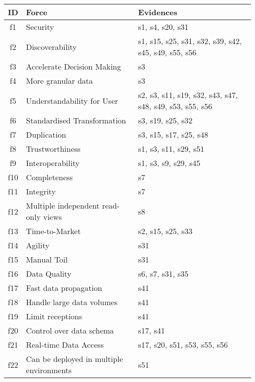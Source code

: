 \begin{tabular}{|c|p{}|p{}|}
\hline
{\bf ID} & {\bf Force} & {\bf Evidences}\\
\hline
f1 & Security & \cellcolor{emerald_shape_2} {s1, s4, s20, s31}\\
f2 & Discoverability & \cellcolor{emerald_shape_4} {s1, s15, s25, s31, s32, s39, s42, s45, s49, s55, s56}\\
f3 & Accelerate Decision Making & \cellcolor{emerald_shape_1} {s3}\\
f4 & More granular data & \cellcolor{emerald_shape_1} {s3}\\
f5 & Understandability for User & \cellcolor{emerald_shape_4} {s2, s3, s11, s19, s32, s43, s47, s48, s49, s53, s55, s56}\\
f6 & Standardised Transformation & \cellcolor{emerald_shape_2} {s3, s19, s25, s32}\\
f7 & Duplication & \cellcolor{emerald_shape_3} {s3, s15, s17, s25, s48}\\
f8 & Trustworthiness & \cellcolor{emerald_shape_3} {s1, s3, s11, s29, s51}\\
f9 & Interoperability & \cellcolor{emerald_shape_3} {s1, s3, s9, s29, s45}\\
f10 & Completeness & \cellcolor{emerald_shape_1} {s7}\\
f11 & Integrity & \cellcolor{emerald_shape_1} {s7}\\
f12 & Multiple independent read-only views & \cellcolor{emerald_shape_1} {s8}\\
f13 & Time-to-Market & \cellcolor{emerald_shape_2} {s2, s15, s25, s33}\\
f14 & Agility & \cellcolor{emerald_shape_1} {s31}\\
f15 & Manual Toil & \cellcolor{emerald_shape_1} {s31}\\
f16 & Data Quality & \cellcolor{emerald_shape_2} {s6, s7, s31, s35}\\
f17 & Fast data propagation & \cellcolor{emerald_shape_1} {s41}\\
f18 & Handle large data volumes & \cellcolor{emerald_shape_1} {s41}\\
f19 & Limit receptions & \cellcolor{emerald_shape_1} {s41}\\
f20 & Control over data schema & \cellcolor{emerald_shape_1} {s17, s41}\\
f21 & Real-time Data Access & \cellcolor{emerald_shape_3} {s17, s20, s51, s53, s55, s56}\\
f22 & Can be deployed in multiple environments & \cellcolor{emerald_shape_1} {s51}\\

\end{tabular}
